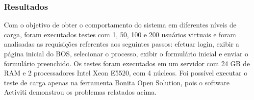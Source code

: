\documentclass[12pt]{article}
\begin{document}



\subsubsection{Resultados}
Com o objetivo de obter o comportamento do sistema em diferentes níveis de carga, foram executados testes com 1, 50, 100 e 200 usuários virtuais e foram analisadas as requisições referentes aos seguintes passos: efetuar login, exibir a página inicial do BOS, selecionar o processo, exibir o formulário inicial e enviar o formulário preenchido. Os testes foram executados em um servidor com 24 GB de RAM e 2 processadores Intel Xeon E5520, com 4 núcleos. Foi possível executar o teste de carga apenas na ferramenta Bonita Open Solution, pois o software Activiti demonstrou os problemas relatados acima.

\end{document}
